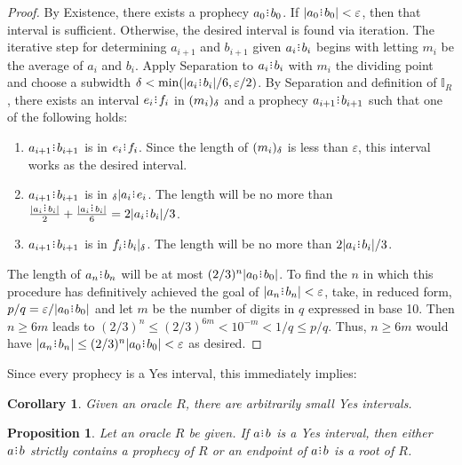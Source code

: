 \documentclass[12pt]{article}
\newtheorem{corollary}{Corollary}[section]
\newtheorem{proposition}{Proposition}[section]
\begin{document}
\begin{proof}
    By Existence, there exists a prophecy $a_0\rint b_0$. If $|a_0\rint b_0| < \varepsilon$, then that interval is sufficient. Otherwise, the desired interval is found via iteration. The iterative step for determining $a_{i+1}$ and $b_{i+1}$ given $a_i\rint b_i$ begins with letting $m_i$ be the average of $a_i$ and $b_i$. Apply Separation to $a_i\rint b_i$ with $m_i$ the dividing point and choose a subwidth $\delta < \min(|a_i\rint b_i|/6, \varepsilon /2)$. By Separation and definition of $\mathbb{I}_R$, there exists an interval $e_i\rint f_i$ in $(m_i)_{\delta}$ and a prophecy $a_{i+1}\rint b_{i+1}$ such that one of the following holds:  
    \begin{enumerate}
        \item $a_{i+1}\rint b_{i+1}$ is in $e_i\rint f_i$. Since the length of $(m_i)_{\delta}$ is less than $\varepsilon$, this interval works as the desired interval.  
        \item  $a_{i+1}\rint b_{i+1}$ is in ${}_\delta|a_i \rint e_i$. The length will be no more than $\frac{|a_i\rint b_i|}{2}  + \frac{|a_i\rint b_i|}{6} = 2|a_i\rint b_i|/3$.
        \item  $a_{i+1}\rint b_{i+1}$ is in $f_i\rint b_i|_\delta$. The length will be no more than $2|a_i\rint b_i|/3$.
    \end{enumerate}
    The length of $a_n\rint b_n$ will be at most $(2/3)^n |a_0\rint b_0|$. To find the $n$ in which this procedure has definitively achieved the goal of $|a_n\rint b_n|<\varepsilon$,  take, in reduced form, $p/q = \varepsilon/|a_0\rint b_0|$ and let $m$ be the number of digits in $q$ expressed in base 10. Then $n \geq  6m$ leads to  $(2/3)^n \leq (2/3)^{6m} < 10^{-m} < 1/q \leq p/q$. Thus, $n \geq 6m$ would have $|a_n\rint b_n| \leq (2/3)^n |a_0\rint b_0| < \varepsilon$ as desired. 
\end{proof}

Since every prophecy is a Yes interval, this immediately implies: 
\begin{corollary}
    Given an oracle $R$, there are arbitrarily small Yes intervals. 
\end{corollary}



\begin{proposition}\label{os-yescat}
    Let an oracle $R$ be given. If $a\rint b$ is a Yes interval, then either $a\rint b$ strictly contains a prophecy of $R$ or an endpoint of $a\rint b$ is a root of $R$. 
\end{proposition}
\end{document}
